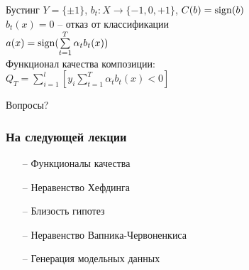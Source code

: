 \documentclass[10pt]{beamer}
\begin{document}
{
\begin{frame}{Бустинг}
  $Y = \{\pm 1\}$, $b_t: X\rightarrow \{-1, 0, +1\}$, $C(b) = \operatorname{sign}(b)$\\
  $b_t(x) = 0$ -- отказ от классификации\\
  \bigbreak
  \pause
  $a(x) = \operatorname{sign}(\sum\limits_{t=1}^{T} \alpha_t b_t(x))$\\
  \bigbreak
  Функционал качества композиции:\\
  $Q_T = \sum\limits_{i=1}^l [y_i \sum\limits_{t=1}^{T} \alpha_t b_t(x) < 0 ]$
\end{frame}
}

\begin{frame}[standout]
  Вопросы?
\end{frame}

\appendix

\begin{frame}\frametitle{На следующей лекции}
	\begin{itemize}
    	\item[--] Функционалы качества
    	\item[--] Неравенство Хефдинга
    	\item[--] Близость гипотез
    	\item[--] Неравенство Вапника-Червоненкиса
    	\item[--] Генерация модельных данных    	    	
	\end{itemize}
\end{frame}
\end{document}
